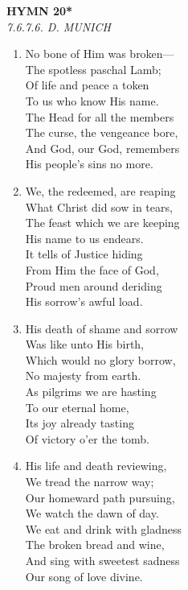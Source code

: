 \documentclass[11pt,a4paper]{article}
\begin{document}
\newpage
\begin{center}
    {\Large \textbf{HYMN 20*\textdagger{}}}
    \\
    \textit{7.6.7.6. D. MUNICH}
\end{center}
\vspace{1em}

\begin{enumerate}
    \item No bone of Him was broken--- \\
        The spotless paschal Lamb; \\
        Of life and peace a token \\
        To us who know His name. \\
        The Head for all the members \\
        The curse, the vengeance bore, \\
        And God, our God, remembers \\
        His people's sins no more.

    \item We, the redeemed, are reaping \\
        What Christ did sow in tears, \\
        The feast which we are keeping \\
        His name to us endears. \\
        It tells of Justice hiding \\
        From Him the face of God, \\
        Proud men around deriding \\
        His sorrow's awful load.

    \item His death of shame and sorrow \\
        Was like unto His birth, \\
        Which would no glory borrow, \\
        No majesty from earth. \\
        As pilgrims we are hasting \\
        To our eternal home, \\
        Its joy already tasting \\
        Of victory o'er the tomb.

    \item His life and death reviewing, \\
        We tread the narrow way; \\
        Our homeward path pursuing, \\
        We watch the dawn of day. \\
        We eat and drink with gladness \\
        The broken bread and wine, \\
        And sing with sweetest sadness \\
        Our song of love divine.

\end{enumerate}
\end{document}
